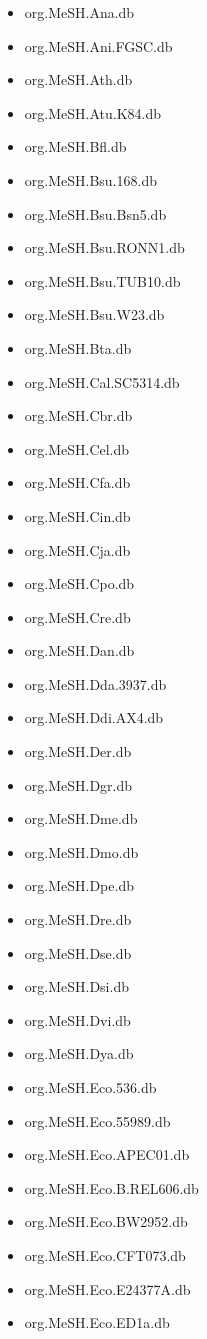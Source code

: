\documentclass[margin,line,10pt]{res}
\newenvironment{list1}{
  \begin{list}{\ding{113}}{%
      \setlength{\itemsep}{0in}
      \setlength{\parsep}{0in} \setlength{\parskip}{0in}
      \setlength{\topsep}{0in} \setlength{\partopsep}{0in} 
      \setlength{\leftmargin}{0.17in}}}{\end{list}}
\begin{document}
\begin{resume}
\begin{list1}
\begin{multicols}{2}
\begin{itemize}
\item org.MeSH.Ana.db
\item org.MeSH.Ani.FGSC.db
\item org.MeSH.Ath.db
\item org.MeSH.Atu.K84.db
\item org.MeSH.Bfl.db
\item org.MeSH.Bsu.168.db
\item org.MeSH.Bsu.Bsn5.db 
\item org.MeSH.Bsu.RONN1.db
\item org.MeSH.Bsu.TUB10.db
\item org.MeSH.Bsu.W23.db  
\item org.MeSH.Bta.db 
\item org.MeSH.Cal.SC5314.db
\item org.MeSH.Cbr.db 
\item org.MeSH.Cel.db
\item org.MeSH.Cfa.db
\item org.MeSH.Cin.db
\item org.MeSH.Cja.db
\item org.MeSH.Cpo.db
\item org.MeSH.Cre.db  
\item org.MeSH.Dan.db
\item org.MeSH.Dda.3937.db
\item org.MeSH.Ddi.AX4.db
\item org.MeSH.Der.db 
\item org.MeSH.Dgr.db 
\item org.MeSH.Dme.db 
\item org.MeSH.Dmo.db 
\item org.MeSH.Dpe.db
\item org.MeSH.Dre.db
\item org.MeSH.Dse.db
\item org.MeSH.Dsi.db
\item org.MeSH.Dvi.db  
\item org.MeSH.Dya.db
\item org.MeSH.Eco.536.db    
\item org.MeSH.Eco.55989.db
\item org.MeSH.Eco.APEC01.db 
\item org.MeSH.Eco.B.REL606.db
\item org.MeSH.Eco.BW2952.db 
\item org.MeSH.Eco.CFT073.db
\item org.MeSH.Eco.E24377A.db   
\item org.MeSH.Eco.ED1a.db 

\end{itemize}
\end{multicols}
\end{list1}
\end{resume}
\end{document}
